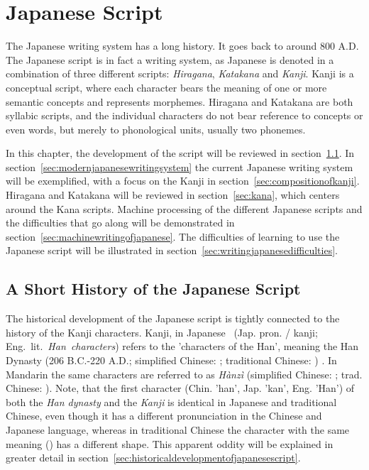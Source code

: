 
\chapter{Japanese Script}
\label{sec:japansescript}

The Japanese writing system has a long history. It goes back to around 800 A.D. 
The Japanese script is in fact a writing system, as Japanese is denoted in 
a combination of three different scripts: \emph{Hiragana}, \emph{Katakana} and 
\emph{Kanji}. Kanji is a conceptual script, where each character bears the 
meaning of one or more semantic concepts and represents morphemes. 
Hiragana and Katakana are both syllabic scripts, and the individual characters do
not bear reference to concepts or even words, but merely to phonological units, 
usually two phonemes.

In this chapter, the development of the script will be reviewed in 
section~\ref{sec:ashorthistoryofjapanesewritingsystem}.
In section~\ref{sec:modernjapanesewritingsystem} the current Japanese writing 
system will be exemplified, with a focus on the Kanji in 
section~\ref{sec:compositionofkanji}. Hiragana and Katakana will be reviewed in
section~\ref{sec:kana}, which centers around the Kana scripts. 
Machine processing of the different Japanese scripts and the difficulties that
go along will be demonstrated in section~\ref{sec:machinewritingofjapanese}.
The difficulties of learning to use the Japanese script will be illustrated in 
section~\ref{sec:writingjapanesedifficulties}.

\section{A Short History of the Japanese Script}
\label{sec:ashorthistoryofjapanesewritingsystem}

The historical development of the Japanese script is tightly connected to the 
history of the Kanji characters. Kanji, in Japanese 
~(Jap. pron.  / kanji; Eng.~lit.~\emph{Han~characters}) 
refers to the 'characters of the Han', meaning the Han Dynasty 
(206 B.C.-220 A.D.; simplified Chinese: ; traditional Chinese: 
) . In Mandarin the same characters are 
referred to as \emph{Hànzì} (simplified Chinese: ; 
trad. Chinese: ).
Note, that the first character  (Chin. 'han', Jap. 'kan', Eng. 'Han') 
of both the \emph{Han dynasty} and the \emph{Kanji} is identical in Japanese and 
traditional Chinese, even though it has a different pronunciation in the 
Chinese and Japanese language, whereas in traditional Chinese the character with
the same meaning () has a different shape. This apparent oddity will be 
explained in greater detail in 
section~\ref{sec:historicaldevelopmentofjapanesescript}.

